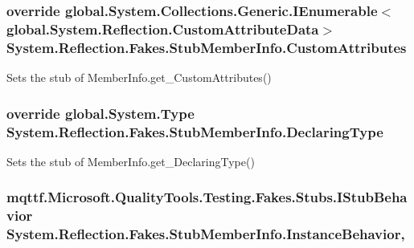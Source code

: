 \hypertarget{class_system_1_1_reflection_1_1_fakes_1_1_stub_member_info_ad8e0706bff84d446a054bbff6abd1f1e}{
\subsubsection[{Custom\-Attributes}]{\setlength{\rightskip}{0pt plus 5cm}override global.\-System.\-Collections.\-Generic.\-I\-Enumerable$<$global.\-System.\-Reflection.\-Custom\-Attribute\-Data$>$ System.\-Reflection.\-Fakes.\-Stub\-Member\-Info.\-Custom\-Attributes\hspace{0.3cm}{\ttfamily [get]}}}\label{class_system_1_1_reflection_1_1_fakes_1_1_stub_member_info_ad8e0706bff84d446a054bbff6abd1f1e}


Sets the stub of Member\-Info.\-get\-\_\-\-Custom\-Attributes()

\hypertarget{class_system_1_1_reflection_1_1_fakes_1_1_stub_member_info_a70ed5c23769a1560b516f0073f98a794}{
\subsubsection[{Declaring\-Type}]{\setlength{\rightskip}{0pt plus 5cm}override global.\-System.\-Type System.\-Reflection.\-Fakes.\-Stub\-Member\-Info.\-Declaring\-Type\hspace{0.3cm}{\ttfamily [get]}}}\label{class_system_1_1_reflection_1_1_fakes_1_1_stub_member_info_a70ed5c23769a1560b516f0073f98a794}


Sets the stub of Member\-Info.\-get\-\_\-\-Declaring\-Type()

\hypertarget{class_system_1_1_reflection_1_1_fakes_1_1_stub_member_info_a5cc2e3d1d7afab5e8c143e0894788c1d}{
\subsubsection[{Instance\-Behavior}]{\setlength{\rightskip}{0pt plus 5cm}mqttf.\-Microsoft.\-Quality\-Tools.\-Testing.\-Fakes.\-Stubs.\-I\-Stub\-Behavior System.\-Reflection.\-Fakes.\-Stub\-Member\-Info.\-Instance\-Behavior\hspace{0.3cm}{\ttfamily [get]}, {\ttfamily [set]}}}\label{class_system_1_1_reflection_1_1_fakes_1_1_stub_member_info_a5cc2e3d1d7afab5e8c143e0894788c1d}


